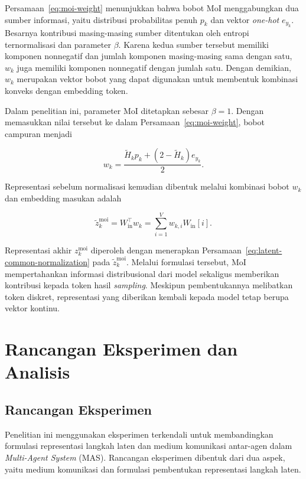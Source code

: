 Persamaan~\eqref{eq:moi-weight} menunjukkan bahwa bobot MoI menggabungkan dua sumber informasi, yaitu distribusi probabilitas penuh $p_k$ dan vektor \textit{one-hot} $e_{y_k}$. Besarnya kontribusi masing-masing sumber ditentukan oleh entropi ternormalisasi dan parameter $\beta$. Karena kedua sumber tersebut memiliki komponen nonnegatif dan jumlah komponen masing-masing sama dengan satu, $w_k$ juga memiliki komponen nonnegatif dengan jumlah satu. Dengan demikian, $w_k$ merupakan vektor bobot yang dapat digunakan untuk membentuk kombinasi konveks dengan embedding token.

Dalam penelitian ini, parameter MoI ditetapkan sebesar $\beta=1$. Dengan memasukkan nilai tersebut ke dalam Persamaan~\eqref{eq:moi-weight}, bobot campuran menjadi

\begin{equation}
w_k
=
\frac{
\widetilde H_kp_k
+
\left(2-\widetilde H_k\right)e_{y_k}
}{2}.
\label{eq:moi-final-weight}
\end{equation}


Representasi sebelum normalisasi kemudian dibentuk melalui kombinasi bobot $w_k$ dan embedding masukan adalah

\begin{equation}
\widetilde z_k^{\mathrm{moi}}
=
W_{\mathrm{in}}^{\top}w_k
=
\sum_{i=1}^{V}w_{k,i}W_{\mathrm{in}}[i].
\label{eq:moi-prelatent}
\end{equation}

Representasi akhir $z_k^{\mathrm{moi}}$ diperoleh dengan menerapkan Persamaan~\eqref{eq:latent-common-normalization} pada $\widetilde z_k^{\mathrm{moi}}$. Melalui formulasi tersebut, MoI mempertahankan informasi distribusional dari model sekaligus memberikan kontribusi kepada token hasil \textit{sampling}. Meskipun pembentukannya melibatkan token diskret, representasi yang diberikan kembali kepada model tetap berupa vektor kontinu.


\section{Rancangan Eksperimen dan Analisis}
\label{sec:rancangan-eksperimen-analisis}


\subsection{Rancangan Eksperimen}
\label{subsec:rancangan-eksperimen}

Penelitian ini menggunakan eksperimen terkendali untuk membandingkan
formulasi representasi langkah laten dan medium komunikasi antar-agen
dalam \textit{Multi-Agent System} (MAS). Rancangan eksperimen dibentuk
dari dua aspek, yaitu medium komunikasi dan formulasi pembentukan representasi
langkah laten.

